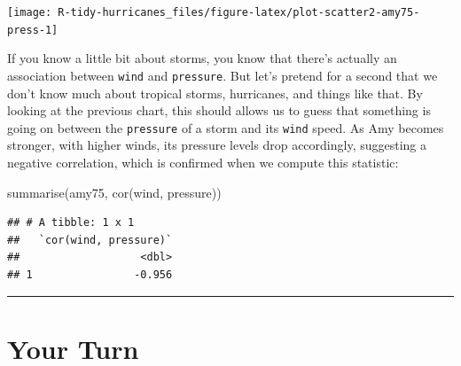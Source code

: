 \documentclass[
]{book}
\newenvironment{Shaded}{\begin{snugshade}}{\end{snugshade}}
\newcommand{\FunctionTok}[1]{\textcolor[rgb]{0.00,0.00,0.00}{#1}}
\newcommand{\NormalTok}[1]{#1}
\begin{document}
\begin{center}\texttt{[image: R-tidy-hurricanes\_files/figure-latex/plot-scatter2-amy75-press-1]} \end{center}

If you know a little bit about storms, you know that there's actually an
association between \texttt{wind} and \texttt{pressure}. But let's pretend for a second that
we don't know much about tropical storms, hurricanes, and things like that.
By looking at the previous chart, this should allows us to guess that something
is going on between the \texttt{pressure} of a storm and its \texttt{wind} speed. As Amy
becomes stronger, with higher winds, its pressure levels drop accordingly,
suggesting a negative correlation, which is confirmed when we compute this
statistic:

\begin{Shaded}
\begin{Highlighting}[]
\FunctionTok{summarise}\NormalTok{(amy75, }\FunctionTok{cor}\NormalTok{(wind, pressure))}
\end{Highlighting}
\end{Shaded}

\begin{verbatim}
## # A tibble: 1 x 1
##   `cor(wind, pressure)`
##                   <dbl>
## 1                -0.956
\end{verbatim}

\begin{center}\rule{0.5\linewidth}{0.5pt}\end{center}

\hypertarget{your-turn-1}{%
\section{Your Turn}\label{your-turn-1}}
\end{document}
